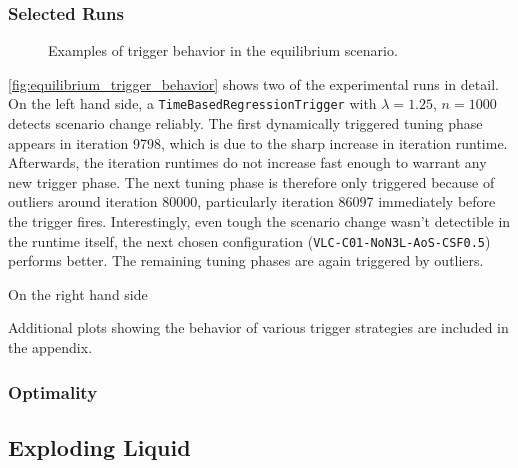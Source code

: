 \subsubsection{Selected Runs}
\begin{figure}[htpb]
	\begin{subfigure}{0.5\textwidth}
		\centering
	\end{subfigure}
	\begin{subfigure}{0.5\textwidth}
		\centering
	\end{subfigure}
	\caption{Examples of trigger behavior in the equilibrium scenario.}
	\label{fig:equilibrium_trigger_behavior}
\end{figure}

\autoref{fig:equilibrium_trigger_behavior} shows two of the experimental runs in detail. On the left hand side, a \texttt{TimeBasedRegressionTrigger} with $\lambda=1.25$, $n=1000$ detects scenario change reliably. The first dynamically triggered tuning phase appears in iteration \num{9798}, which is due to the sharp increase in iteration runtime. Afterwards, the iteration runtimes do not increase fast enough to warrant any new trigger phase. The next tuning phase is therefore only triggered because of outliers around iteration \num{80000}, particularly iteration \num{86097} immediately before the trigger fires. Interestingly, even tough the scenario change wasn't detectible in the runtime itself, the next chosen configuration (\texttt{VLC-C01-NoN3L-AoS-CSF0.5}) performs better. The remaining tuning phases are again triggered by outliers.


On the right hand side\textellipsis


Additional plots showing the behavior of various trigger strategies are included in the appendix.




\subsubsection{Optimality}


\subsection{Exploding Liquid}
